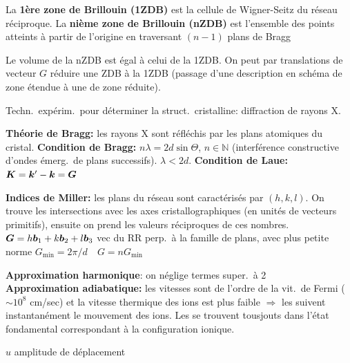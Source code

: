 \begin{squishlist}
    \item La \textbf{1ère zone de Brillouin (1ZDB)} est la cellule de Wigner-Seitz du réseau réciproque. La \textbf{nième zone de Brillouin (nZDB)} est l'ensemble des points atteints à partir de l'origine en traversant $(n-1)$ plans de Bragg
    \item Le volume de la nZDB est égal à celui de la 1ZDB. On peut par translations de vecteur $G$ réduire une ZDB à la 1ZDB (passage d'une description en schéma de zone étendue à une de zone réduite).
\end{squishlist}

Techn.\ expérim.\ pour déterminer la struct.\ cristalline: diffraction de rayons X.
\begin{squishlist}
    \item \textbf{Théorie de Bragg:} les rayons X sont réfléchis par les plans atomiques du cristal. \textbf{Condition de Bragg:} $n \lambda = 2d \sin \Theta$, $n \in \mathbb{N}$ (interférence constructive d'ondes émerg.\ de plans successifs). $\lambda < 2d$. \quad
    \textbf{Condition de Laue:} $\bm{K} = \bm{k}'-\bm{k} = \bm{G}$

    \item \textbf{Indices de Miller:} les plans du réseau sont caractérisés par $(h,k,l)$. On trouve les intersections avec les axes cristallographiques (en unités de vecteurs primitifs), ensuite on prend les valeurs réciproques de ces nombres.\\
    $\bm{G} = h \bm{b}_1 + k \bm{b}_2 + l \bm{b}_3$ vec du RR perp.\ à la famille de plans, avec plus petite norme $G_{\min} = 2\pi / d \quad G = n G_{\min}$
\end{squishlist}

\begin{squishlist}
    \item \textbf{Approximation harmonique}: on néglige termes super.\ à 2
    \\ \textbf{Approximation adiabatique:} les vitesses \elec sont de l'ordre de la vit.\ de Fermi ($\sim 10^8$ cm/sec) et la vitesse thermique des ions est plus faible $\Rightarrow$ les \elec suivent instantanément le mouvement des ions. Les \elec se trouvent tousjouts dans l'état fondamental correspondant à la configuration ionique.
    \item $u$ amplitude de déplacement
\end{squishlist}

